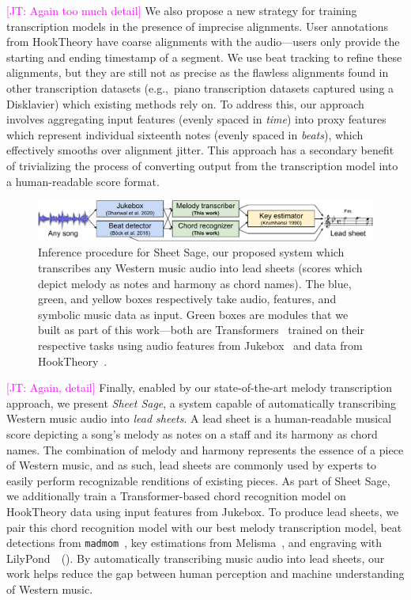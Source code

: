 \documentclass{article}
\newcommand{\madmom}{\texttt{madmom}}
\newcommand{\hooktheory}{HookTheory}
\newcommand{\sheetsage}{Sheet Sage}
\newcommand\john[1]{\textcolor{magenta}{[JT: #1]}}
\begin{document}
\john{Again too much detail} We also propose a new strategy for training transcription models in the presence of imprecise alignments. 
User annotations from \hooktheory{} have coarse alignments with the audio---users only provide the starting and ending timestamp of a segment. 
We use beat tracking to refine these alignments, but they are still not as precise as the flawless alignments found in other transcription datasets (e.g.,~piano transcription datasets captured using a Disklavier) which existing methods rely on. 
To address this, our approach involves aggregating input features (evenly spaced in \emph{time}) into proxy features which represent individual sixteenth notes (evenly spaced in \emph{beats}), 
which effectively smooths over alignment jitter. 
This approach has a secondary benefit of trivializing the process of converting output from the transcription model into a human-readable score format. %

\begin{figure}
    \centering
    \includegraphics[width=\linewidth]{figs/sheet_sage.pdf}
    \caption{
    Inference procedure for Sheet Sage, our proposed system which transcribes any Western music audio into lead sheets (scores which depict melody as notes and harmony as chord names). The blue, green, and yellow boxes respectively take audio, features, and symbolic music data as input. Green boxes are modules that we built as part of this work---both are Transformers~\cite{vaswani2017attention} trained on their respective tasks using audio features from Jukebox~\cite{dhariwal2020jukebox} and data from \hooktheory~\cite{hooktheory}.}
    \label{fig:sheet_sage}
\end{figure}

\john{Again, detail} Finally, enabled by our state-of-the-art melody transcription approach, we present \emph{\sheetsage}, a system capable of automatically transcribing Western music audio into \emph{lead sheets}. 
A lead sheet is a human-readable musical score depicting a song's melody as notes on a staff and its harmony as chord names. 
The combination of melody and harmony represents the essence of a piece of Western music, and as such, lead sheets are commonly used by experts to easily perform recognizable renditions of existing pieces. 
As part of \sheetsage, we additionally train a Transformer-based chord recognition model on \hooktheory{} data using input features from Jukebox. 
To produce lead sheets, we pair this chord recognition model with our best melody transcription model, beat detections from \madmom~\cite{bock2016madmom,bock2016joint}, key estimations from Melisma~\cite{krumhansl1990cognitive,temperley1999key,sleator2001melisma}, and engraving with LilyPond~\cite{nienhuys2003lilypond}~(). 
By automatically transcribing music audio into lead sheets, our work helps reduce the gap between human perception and machine understanding of Western music.
\end{document}
